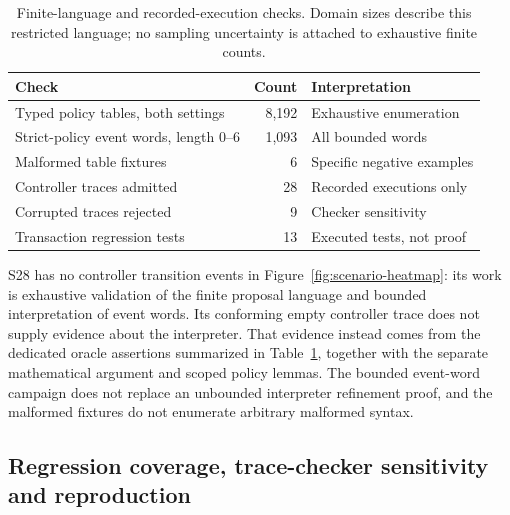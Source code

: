 \documentclass[pdflatex,sn-mathphys-num]{sn-jnl}
\theoremstyle{thmstyleone}
\theoremstyle{thmstylethree}
\theoremstyle{thmstyletwo}
\begin{document}
\begin{table}[tbp]
\centering
\caption{Finite-language and recorded-execution checks. Domain sizes describe this restricted language; no sampling uncertainty is attached to exhaustive finite counts.}\label{tab:validation-domains}
\footnotesize
\setlength{\tabcolsep}{3pt}
\renewcommand{\arraystretch}{1.13}
\begin{tabularx}{\linewidth}{@{}Xrl@{}}\toprule
Check & Count & Interpretation\\\midrule
Typed policy tables, both settings & 8,192 & Exhaustive enumeration\\
Strict-policy event words, length 0--6 & 1,093 & All bounded words\\
Malformed table fixtures & 6 & Specific negative examples\\
Controller traces admitted & 28 & Recorded executions only\\
Corrupted traces rejected & 9 & Checker sensitivity\\
Transaction regression tests & 13 & Executed tests, not proof\\
\bottomrule\end{tabularx}
\end{table}

S28 has no controller transition events in Figure~\ref{fig:scenario-heatmap}: its work is exhaustive validation of the finite proposal language and bounded interpretation of event words. Its conforming empty controller trace does not supply evidence about the interpreter. That evidence instead comes from the dedicated oracle assertions summarized in Table~\ref{tab:validation-domains}, together with the separate mathematical argument and scoped policy lemmas. The bounded event-word campaign does not replace an unbounded interpreter refinement proof, and the malformed fixtures do not enumerate arbitrary malformed syntax.

\subsection{Regression coverage, trace-checker sensitivity and reproduction}
\end{document}
